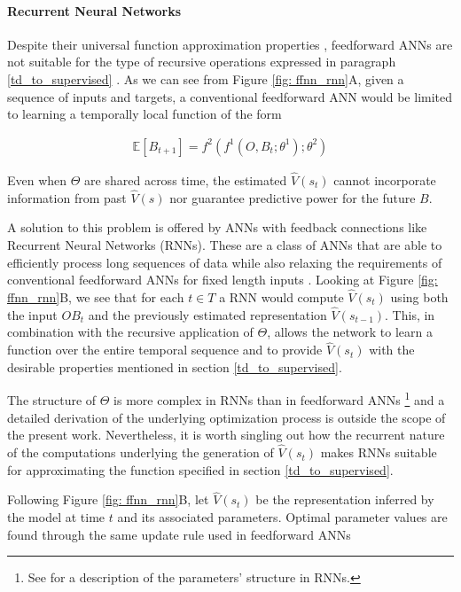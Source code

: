 \paragraph*{\textbf{Recurrent Neural Networks}}
\label{rnn_theory}
Despite their universal function approximation properties \cite{hornik1989multilayer}, feedforward ANNs are not suitable for the type of recursive operations expressed in paragraph \ref{td_to_supervised} \cite{bengio2017deep}. As we can see from Figure \ref{fig: ffnn_rnn}A, given a sequence of inputs and targets, a conventional feedforward ANN would be limited to learning a temporally local function of the form

\begin{gather}
\label{td_ffnn}
    \mathbb{E}[B_{t+1}] = f^2(f^1(O, B_{t}; \theta^{1}); \theta^{2})
\end{gather}

Even when $\Theta$ are shared across time, the estimated $\widehat{V}(s_t)$ cannot incorporate information from past $\widehat{V}(s)$ nor guarantee predictive power for the future $B$. 

A solution to this problem is offered by ANNs with feedback connections like Recurrent Neural Networks (RNNs). These  are a class of ANNs that are able to efficiently process long sequences of data while also relaxing the requirements of conventional feedforward ANNs for fixed length inputs \cite{bengio2017deep}. Looking at Figure \ref{fig: ffnn_rnn}B, we see that for each $t \in T$ a RNN would compute $\widehat{V}(s_t)$ using both the input $OB_{t}$ and the previously estimated representation $\widehat{V}(s_{t-1})$. This, in combination with the recursive application of $\Theta$, allows the network to learn a function over the entire temporal sequence and to provide $\widehat{V}(s_t)$ with the desirable properties mentioned in section \ref{td_to_supervised}. 

The structure of $\Theta$ is more complex in RNNs than in feedforward ANNs \footnote{See \cite{bengio2017deep} for a description of the parameters' structure in RNNs.} and a detailed derivation of the underlying optimization process is outside the scope of the present work. Nevertheless, it is worth singling out how the recurrent nature of the computations underlying the generation of $\widehat{V}(s_t)$  makes RNNs suitable for approximating the function specified in section \ref{td_to_supervised}.

Following Figure \ref{fig: ffnn_rnn}B, let $\widehat{V}(s_t)$ be the representation inferred by the model at time $t$ and its associated parameters. Optimal parameter values are found through the same update rule used in feedforward ANNs

